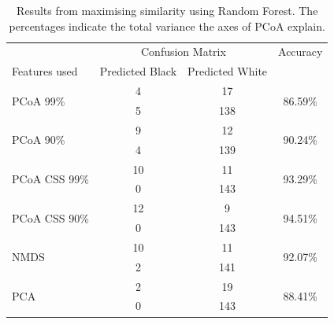 \begin{table}[h]
	\centering
	\begin{tabular}{l c  c c}
		\toprule
		&\multicolumn{2}{c}{Confusion Matrix} & Accuracy\\
		Features used & Predicted Black&Predicted White&\\
		\midrule
		\multirow{2}{*}{PCoA 99\%} &4 &17&\multirow{2}{*}{86.59\%}\\
		&	 5&138&\\
		\cmidrule{2-3}
		\multirow{2}{*}{PCoA 90\%} &9 &12&\multirow{2}{*}{90.24\%}\\
		&	 4&139&\\
		\cmidrule{2-3}
		\multirow{2}{*}{PCoA CSS 99\%} &10 &11&\multirow{2}{*}{93.29\%}\\
		&	 0&143&\\
		\cmidrule{2-3}
		\multirow{2}{*}{PCoA CSS 90\%} &12 &9&\multirow{2}{*}{94.51\%}\\
		&	 0&143&\\
		\cmidrule{2-3}
		\multirow{2}{*}{NMDS}&10 &11&\multirow{2}{*}{92.07\%}\\
		&	 2&141&\\
						\cmidrule{2-3}
		\multirow{2}{*}{PCA}&2 &19&\multirow{2}{*}{88.41\%}\\
		&	 0&143&\\
		\bottomrule
	\end{tabular}
	\caption{Results from maximising similarity using Random Forest. The percentages indicate the total variance the axes of PCoA explain.}
	\label{table:rfrsimilarityappendix}
\end{table}






